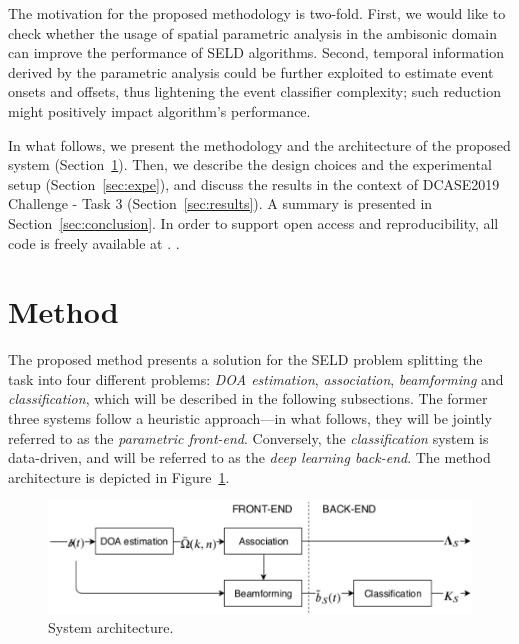 The motivation for the proposed methodology is two-fold.
First, we would like to check whether the usage of spatial parametric analysis in the ambisonic domain can improve the performance of SELD algorithms.
Second, temporal information derived by the parametric analysis could be further exploited to estimate event onsets and offsets, thus lightening the event classifier complexity; such reduction might positively impact algorithm's performance.

In what follows, we present the methodology and the architecture of the proposed system (Section~\ref{sec:method}). Then, we describe the design choices and the experimental setup (Section~\ref{sec:expe}), and discuss the results in the context of DCASE2019 Challenge - Task 3 (Section~\ref{sec:results}). A summary is presented in Section~\ref{sec:conclusion}. In order to support open access and reproducibility, all code is freely available at \cite{code}. .


\section{Method}
\label{sec:method}

The proposed method presents a solution for the SELD problem splitting the task into four different problems: \textit{DOA  estimation}, \textit{association}, \textit{beamforming} and \textit{classification}, which will be described in the following subsections.
The former three systems follow a heuristic approach---in what follows, they will be jointly referred to as the \textit{parametric front-end}. Conversely, the \textit{classification} system is data-driven, and will be referred to as the \textit{deep learning back-end}. The method architecture is depicted in Figure~\ref{fig:diagram_all}.

\begin{figure}[h]
	\centering
    \includegraphics[width=\columnwidth]{Figures//SELD/dcase_challenge_tech_report_all2.pdf}
    \caption{System architecture.}
    \label{fig:diagram_all}

\end{figure}

